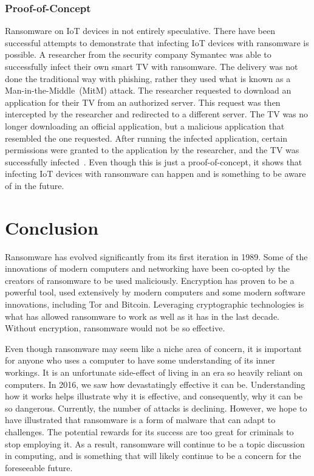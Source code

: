 \documentclass{IEEEtran}
\begin{document}
\subsubsection{Proof-of-Concept}
Ransomware on IoT devices in not entirely speculative. There have been successful attempts to demonstrate that infecting IoT devices with ransomware is possible. A researcher from the security company Symantec was able to successfully infect their own smart TV with ransomware. The delivery was not done the traditional way with phishing, rather they used what is known as a Man-in-the-Middle~(MitM) attack. The researcher requested to download an application for their TV from an authorized server. This request was then intercepted by the researcher and redirected to a different server. The TV was no longer downloading an official application, but a malicious application that resembled the one requested. After running the infected application, certain permissions were granted to the application by the researcher, and the TV was successfully infected~\cite{RN7}. Even though this is just a proof-of-concept, it shows that infecting IoT devices with ransomware can happen and is something to be aware of in the future. 

\section{Conclusion}
Ransomware has evolved significantly from its first iteration in 1989. Some of the innovations of modern computers and networking have been co-opted by the creators of ransomware to be used maliciously. Encryption has proven to be a powerful tool, used extensively by modern computers and some modern software innovations, including Tor and Bitcoin. Leveraging cryptographic technologies is what has allowed ransomware to work as well as it has in the last decade. Without encryption, ransomware would not be so effective.

Even though ransomware may seem like a niche area of concern, it is important for anyone who uses a computer to have some understanding of its inner workings. It is an unfortunate side-effect of living in an era so heavily reliant on computers. In 2016, we saw how devastatingly effective it can be. Understanding how it works helps illustrate why it is effective, and consequently, why it can be so dangerous. Currently, the number of attacks is declining. However, we hope to have illustrated that ransomware is a form of malware that can adapt to challenges. The potential rewards for its success are too great for criminals to stop employing it. As a result, ransomware will continue to be a topic discussion in computing, and is something that will likely continue to be a concern for the foreseeable future.

\clearpage


\end{document}
